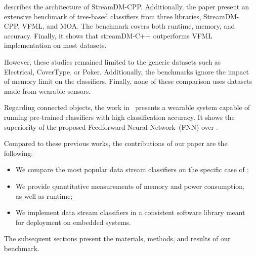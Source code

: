 \cite{StreamDM-CPP} describes the architecture of StreamDM-CPP. Additionally,
the paper present an extensive benchmark of tree-based classifiers from three
libraries, StreamDM-CPP, VFML, and MOA. The benchmark covers both runtime,
memory, and accuracy. Finally, it shows that streamDM-C++ outperforms VFML
implementation on most datasets.

However, these studies remained limited to the generic datasets such as
Electrical, CoverType, or Poker. Additionally, the benchmarks ignore the impact
of memory limit on the classifiers. Finally, none of these comparison uses
datasets made from wearable sensors.

Regarding connected objects, the work in~\cite{omid_2019} presents a
wearable system capable of running pre-trained classifiers  with high classification accuracy. It shows
the superiority of the proposed Feedforward Neural
Network~(FNN) over \knn. 

Compared to these previous works, the contributions of our paper are the following:
\begin{itemize}
    \item We compare the most popular data stream classifiers on the specific case of \har;
    \item We provide quantitative measurements of memory and power consumption, as well as runtime;
    \item We implement data stream classifiers in a consistent software library meant for deployment on embedded systems.
\end{itemize} 
The subsequent sections present the materials, methods, and results of our benchmark.


